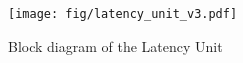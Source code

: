 \begin{figure}[t]
  \centering
  \texttt{[image: fig/latency\_unit\_v3.pdf]}
  \caption{Block diagram of the Latency Unit}
  \label{fig:latency_unit}
\end{figure}